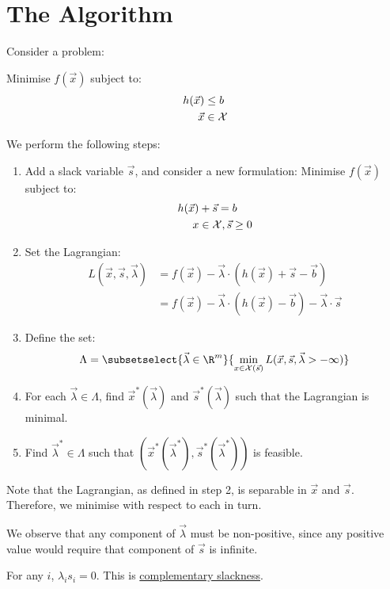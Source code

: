 \documentclass[../Main.tex]{subfiles}
\begin{document}
\section{The Algorithm}
Consider a problem:

Minimise $f(\vec{x})$ subject to:
\begin{align*}
    h(\vec{x}) &\leq b \\
    \vec{x} &\in \mathcal{X}
\end{align*}

We perform the following steps:
\begin{enumerate}
    \item Add a slack variable $\vec{s}$, and consider a new formulation:
        Minimise $f(\vec{x})$ subject to:
        \begin{align*}
            h(\vec{x}) &+ \vec{s} = b \\
            x &\in \mathcal{X}, \vec{s} \geq 0
        \end{align*}
    \item Set the Lagrangian:
        \begin{align*}
            L(\vec{x}, \vec{s}, \vec{\lambda}) &= f(\vec{x}) - \vec{\lambda} \cdot (h(\vec{x}) + \vec{s} - \vec{b}) \\
            &= f(\vec{x}) - \vec{\lambda} \cdot (h(\vec{x}) - \vec{b}) - \vec{\lambda} \cdot \vec{s}
        \end{align*}
    \item Define the set:
        \begin{equation*}
            \Lambda = \subsetselect{\vec{\lambda} \in \R^m}{\min_{x \in \Xset(\vec{s})} L(\vec{x}, \vec{s}, \vec{\lambda} > -\infty)}
        \end{equation*}
    \item For each $\vec{\lambda} \in \Lambda$, find $\vec{x}^*(\vec{\lambda})$ and $\vec{s}^*(\vec{\lambda})$ such that the Lagrangian is minimal.
    \item Find $\vec{\lambda}^* \in \Lambda$ such that $(\vec{x}^*(\vec{\lambda}^*), \vec{s}^*(\vec{\lambda}^*))$ is feasible.
\end{enumerate}
\begin{remarks}
    \item Note that the Lagrangian, as defined in step 2, is separable in $\vec{x}$ and $\vec{s}$. Therefore, we minimise with respect to each in turn.
    \item We observe that any component of $\vec{\lambda}$ must be non-positive, since any positive value would require that component of $\vec{s}$ is infinite.
    \item For any $i$, $\lambda_i s_i = 0$. This is \underline{complementary slackness}.
\end{remarks}
\end{document}

